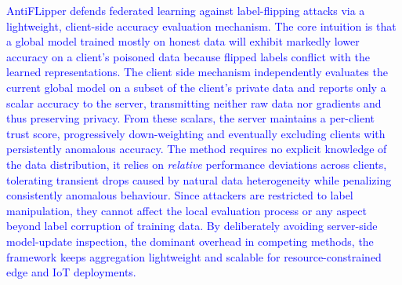 \documentclass[conference]{IEEEtran}
\begin{document}

\textcolor{blue}{AntiFLipper defends federated learning against label-flipping attacks via a lightweight, client-side accuracy evaluation mechanism. The core intuition is that a global model trained mostly on honest data will exhibit markedly lower accuracy on a client's poisoned data because flipped labels conflict with the learned representations. The client side mechanism independently evaluates the current global model on a subset
of the client's private data and reports only a scalar accuracy to the server, transmitting neither raw data nor gradients and thus preserving privacy. From these scalars, the server maintains a per-client trust score, progressively down-weighting and eventually excluding clients with persistently anomalous accuracy. The method requires no explicit knowledge of the data distribution, it relies on \emph{relative} performance deviations across clients, tolerating transient drops caused by natural data heterogeneity while penalizing consistently anomalous behaviour. Since attackers are restricted to label manipulation, they cannot affect the local evaluation process or any aspect beyond label corruption of training data. %
By deliberately avoiding server-side model-update inspection, the dominant overhead in competing methods, the framework keeps aggregation lightweight and scalable for resource-constrained edge and IoT deployments.}
\end{document}
